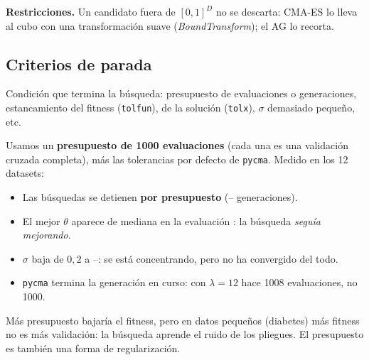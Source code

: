 \documentclass[apuntes]{uc3mmaster}
\begin{document}
\textbf{Restricciones.} Un candidato fuera de $[0,1]^D$ no se descarta: CMA-ES lo lleva al cubo con una
transformación suave (\emph{BoundTransform}); el AG lo recorta.

\subsection{Criterios de parada}
\begin{definicion}
Condición que termina la búsqueda: presupuesto de evaluaciones o generaciones, estancamiento del fitness
(\texttt{tolfun}), de la solución (\texttt{tolx}), $\sigma$ demasiado pequeño, etc.
\end{definicion}
Usamos un \textbf{presupuesto de 1000 evaluaciones} (cada una es una validación cruzada completa), más las
tolerancias por defecto de \texttt{pycma}. Medido en los 12 datasets:
\begin{itemize}
\item Las \nParadaTotal{} búsquedas se detienen \textbf{por presupuesto} (\genMin--\genMax{} generaciones).
\item El mejor $\theta$ aparece de mediana en la evaluación \evalMejorMediana: la búsqueda \emph{seguía mejorando}.
\item $\sigma$ baja de $0{,}2$ a \sigmaFinMin--\sigmaFinMax: se está concentrando, pero no ha convergido del todo.
\item \texttt{pycma} termina la generación en curso: con $\lambda=12$ hace 1008 evaluaciones, no 1000.
\end{itemize}
\begin{cuidado}
Más presupuesto bajaría el fitness, pero en datos pequeños (diabetes) más fitness no es más validación: la búsqueda
aprende el ruido de los pliegues. El presupuesto es también una forma de regularización.
\end{cuidado}
\end{document}
